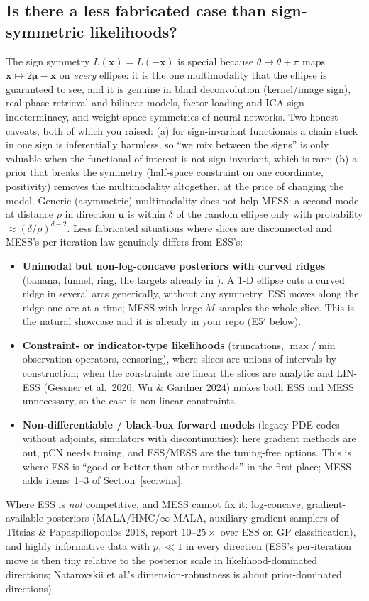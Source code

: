 \documentclass[11pt,a4paper]{article}
\theoremstyle{remark}
\newcommand{\bx}{\bm{x}}
\begin{document}
\subsection{Is there a less fabricated case than sign-symmetric likelihoods?}\label{sec:cases}
The sign symmetry $L(\bx)=L(-\bx)$ is special because $\theta\mapsto\theta+\pi$ maps $\bx\mapsto2\bm\mu-\bx$ on \emph{every} ellipse: it is the one multimodality that the ellipse is guaranteed to see, and it is genuine in blind deconvolution (kernel/image sign), real phase retrieval and bilinear models, factor-loading and ICA sign indeterminacy, and weight-space symmetries of neural networks. Two honest caveats, both of which you raised: (a) for sign-invariant functionals a chain stuck in one sign is inferentially harmless, so ``we mix between the signs'' is only valuable when the functional of interest is not sign-invariant, which is rare; (b) a prior that breaks the symmetry (half-space constraint on one coordinate, positivity) removes the multimodality altogether, at the price of changing the model. Generic (asymmetric) multimodality does not help MESS: a second mode at distance $\rho$ in direction $\bm u$ is within $\delta$ of the random ellipse only with probability $\approx(\delta/\rho)^{d-2}$. Less fabricated situations where slices are disconnected and MESS's per-iteration law genuinely differs from ESS's:
\begin{itemize}[leftmargin=*]
\item \textbf{Unimodal but non-log-concave posteriors with curved ridges} (banana, funnel, ring, the  targets already in ). A 1-D ellipse cuts a curved ridge in several arcs generically, without any symmetry. ESS moves along the ridge one arc at a time; MESS with large $M$ samples the whole slice. This is the natural showcase and it is already in your repo (E5$'$ below).
\item \textbf{Constraint- or indicator-type likelihoods} (truncations, $\max/\min$ observation operators, censoring), where slices are unions of intervals by construction; when the constraints are linear the slices are analytic and LIN-ESS (Gessner et al.\ 2020; Wu \& Gardner 2024) makes both ESS and MESS unnecessary, so the case is non-linear constraints.
\item \textbf{Non-differentiable / black-box forward models} (legacy PDE codes without adjoints, simulators with discontinuities): here gradient methods are out, pCN needs tuning, and ESS/MESS are the tuning-free options. This is where ESS is ``good or better than other methods'' in the first place; MESS adds items~1--3 of Section~\ref{sec:wins}.
\end{itemize}
Where ESS is \emph{not} competitive, and MESS cannot fix it: log-concave, gradient-available posteriors (MALA/HMC/$\infty$-MALA, auxiliary-gradient samplers of Titsias \& Papaspiliopoulos 2018, report $10$--$25\times$ over ESS on GP classification), and highly informative data with $p_1\ll1$ in every direction (ESS's per-iteration move is then tiny relative to the posterior scale in likelihood-dominated directions; Natarovskii et al.'s dimension-robustness is about prior-dominated directions).
\end{document}
